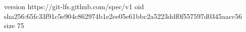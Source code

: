 version https://git-lfs.github.com/spec/v1
oid sha256:65fc33f91c5e904c862974b1e2ee05e61bbc2a5223ddf0f557597d0345aacc56
size 75
